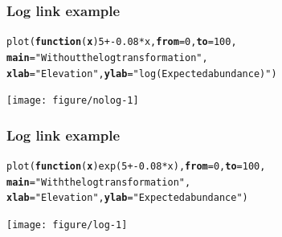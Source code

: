 \documentclass[color=usenames,dvipsnames]{beamer}\usepackage[]{graphicx}\usepackage[]{color}
\makeatletter
\newcommand{\hlnum}[1]{\textcolor[rgb]{0.69,0.494,0}{#1}}%
\newcommand{\hlstr}[1]{\textcolor[rgb]{0.749,0.012,0.012}{#1}}%
\newcommand{\hlopt}[1]{\textcolor[rgb]{0,0,0}{#1}}%
\newcommand{\hlstd}[1]{\textcolor[rgb]{0,0,0}{#1}}%
\newcommand{\hlkwa}[1]{\textcolor[rgb]{0,0,0}{\textbf{#1}}}%
\newcommand{\hlkwc}[1]{\textcolor[rgb]{0,0,0}{\textbf{#1}}}%
\newcommand{\hlkwd}[1]{\textcolor[rgb]{0.004,0.004,0.506}{#1}}%
\newenvironment{kframe}{%
 \def\at@end@of@kframe{}%
 \ifinner\ifhmode%
  \def\at@end@of@kframe{\end{minipage}}%
  \begin{minipage}{\columnwidth}%
 \fi\fi%
 \def\FrameCommand##1{\hskip\@totalleftmargin \hskip-\fboxsep
 \colorbox{shadecolor}{##1}\hskip-\fboxsep
     \hskip-\linewidth \hskip-\@totalleftmargin \hskip\columnwidth}%
 \MakeFramed {\advance\hsize-\width
   \@totalleftmargin\z@ \linewidth\hsize
   \@setminipage}}%
 {\par\unskip\endMakeFramed%
 \at@end@of@kframe}
\newenvironment{knitrout}{}{} %
\makeatother
\begin{document}
\begin{frame}[fragile]
  \frametitle{Log link example}
  \footnotesize
\begin{knitrout}\footnotesize
{}\color{fgcolor}\begin{kframe}
\begin{alltt}
\hlkwd{plot}\hlstd{(}\hlkwa{function}\hlstd{(}\hlkwc{x}\hlstd{)} \hlnum{5} \hlopt{+ -}\hlnum{0.08}\hlopt{*}\hlstd{x,} \hlkwc{from}\hlstd{=}\hlnum{0}\hlstd{,} \hlkwc{to}\hlstd{=}\hlnum{100}\hlstd{,}
     \hlkwc{main}\hlstd{=}\hlstr{"Without the log transformation"}\hlstd{,}
     \hlkwc{xlab}\hlstd{=}\hlstr{"Elevation"}\hlstd{,} \hlkwc{ylab}\hlstd{=}\hlstr{"log(Expected abundance)"}\hlstd{)}
\end{alltt}
\end{kframe}
\end{knitrout}
\begin{center}
  \texttt{[image: figure/nolog-1]}
\end{center}
\end{frame}




\begin{frame}[fragile]
  \frametitle{Log link example}
  \footnotesize
\begin{knitrout}
\color{fgcolor}\begin{kframe}
\begin{alltt}
\hlkwd{plot}\hlstd{(}\hlkwa{function}\hlstd{(}\hlkwc{x}\hlstd{)} \hlkwd{exp}\hlstd{(}\hlnum{5} \hlopt{+ -}\hlnum{0.08}\hlopt{*}\hlstd{x),} \hlkwc{from}\hlstd{=}\hlnum{0}\hlstd{,} \hlkwc{to}\hlstd{=}\hlnum{100}\hlstd{,}
     \hlkwc{main}\hlstd{=}\hlstr{"With the log transformation"}\hlstd{,}
     \hlkwc{xlab}\hlstd{=}\hlstr{"Elevation"}\hlstd{,} \hlkwc{ylab}\hlstd{=}\hlstr{"Expected abundance"}\hlstd{)}
\end{alltt}
\end{kframe}
\end{knitrout}
\begin{center}
  \texttt{[image: figure/log-1]}
\end{center}
\end{frame}
\end{document}
